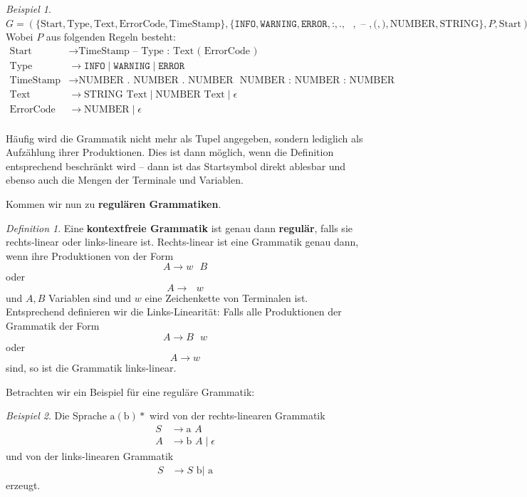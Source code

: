 \documentclass[11pt,a4paper]{scrreport}
\theoremstyle{remark}
\theoremstyle{custom}
\newtheorem{definition}{Definition}[section]
\newtheorem{example}{Beispiel}[section]
\begin{document}
\begin{example}
$
G = (\{\text{Start}, \text{Type}, \text{Text}, \text{ErrorCode}, \text{TimeStamp}\}, \{\texttt{INFO}, \texttt{WARNING}, \texttt{ERROR}, \allowbreak \texttt{:}, \texttt{.}, \texttt{ }, \texttt{ -- }, \texttt{(}, \texttt{)}, \text{NUMBER}, \allowbreak \text{STRING}\}, P, \text{Start}) $ \\
Wobei $P$ aus folgenden Regeln besteht:
\begin{align*}
\text{Start} &\rightarrow \text{TimeStamp} \texttt{ -- } \text{Type} \texttt{ : } \text{Text} \texttt{ ( } \text{ErrorCode} \texttt{ ) } \\
\text{Type} &\rightarrow \texttt{INFO} \mid \texttt{WARNING} \mid \texttt{ERROR} \\
\text{TimeStamp} &\rightarrow \text{NUMBER} \texttt{ . } \text{NUMBER} \text{ . } \text{NUMBER} \texttt{ } \text{NUMBER} \texttt{ : } \text{NUMBER} \texttt{ : } \text{NUMBER} \\
\text{Text} &\rightarrow \text{STRING } \text{Text} \mid \text{NUMBER } \text{Text} \mid \epsilon \\
\text{ErrorCode} &\rightarrow \text{NUMBER} \mid \epsilon
\end{align*} \\
Häufig wird die Grammatik nicht mehr als Tupel angegeben, sondern lediglich als Aufzählung ihrer Produktionen. Dies ist dann möglich, wenn die Definition entsprechend beschränkt wird -- dann ist das Startsymbol direkt ablesbar und ebenso auch die Mengen der Terminale und Variablen.
\end{example}
Kommen wir nun zu \textbf{regulären Grammatiken}.
\begin{definition}
Eine \textbf{kontextfreie Grammatik} ist genau dann \textbf{regulär}, falls sie rechts-linear oder links-lineare ist. Rechts-linear ist eine Grammatik genau dann, wenn ihre Produktionen von der Form
\[A \rightarrow w\text{ }B\] oder \[A \rightarrow\text{ }w\] und $A, B$ Variablen sind und $w$ eine Zeichenkette von Terminalen ist. Entsprechend definieren wir die Links-Linearität: Falls alle Produktionen der Grammatik der Form
\[A \rightarrow B\text{ }w\] oder \[A \rightarrow w\] sind, so ist die Grammatik links-linear.
\end{definition}
Betrachten wir ein Beispiel für eine reguläre Grammatik:
\begin{example}
Die Sprache $\text{a}(\text{b})*$ wird von der rechts-linearen Grammatik 
\begin{align*}
S &\rightarrow \text{a } A \\
A &\rightarrow \text{b } A \mid \epsilon
\end{align*}
und von der links-linearen Grammatik
\begin{align*}
S &\rightarrow S \text{ b} | \text{ a}
\end{align*}
erzeugt.
\end{example}
\end{document}
